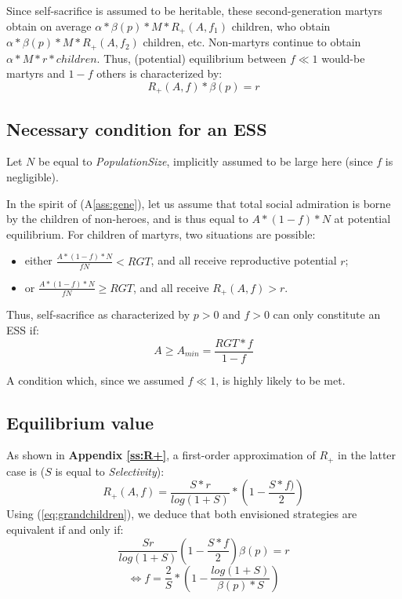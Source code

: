 \documentclass[a4paper,12pt]{report}
\begin{document}
Since self-sacrifice is assumed to be heritable, 
these second-generation martyrs obtain on average $\alpha*\beta(p)*M*R_+(A,f_1)$
children, who obtain $\alpha*\beta(p)*M*R_+(A,f_2)$ children, etc. Non-martyrs
continue to obtain $\alpha*M*r* children$.
Thus, (potential) equilibrium between $f\ll 1$ would-be martyrs and $1-f$ others is
characterized by:
\begin{equation}
    R_+(A,f)*\beta(p) = r
\label{eq:grandchildren}
\end{equation}


\subsection{Necessary condition for an ESS}
\label{ss: exo_existence}

Let $N$ be equal to \emph{PopulationSize}, implicitly assumed to be large here (since $f$
is negligible).

In the spirit of (A\ref{ass:gene}), let us assume
that total social admiration is borne by the children of non-heroes, and is thus equal to
$A*(1-f)*N$ at potential equilibrium. 
For children of martyrs, two situations are possible:

\begin{itemize}
\item either $\frac{A*(1-f)*N}{fN} < RGT$, and 
all receive reproductive potential $r$;
\item or $\frac{A*(1-f)*N}{fN} \geq RGT$, and all receive $R_{+}(A,f)>r$.
\end{itemize}

Thus, self-sacrifice as characterized by $p>0$ and $f>0$ can only constitute an ESS if:
\begin{equation}
    \label{eq:min_ESS_e}
    A \geq A_{min}=\frac{RGT*f}{1-f}
\end{equation}

A condition which, since we assumed $f \ll 1$, is highly likely to be met.

\subsection{Equilibrium value}

As shown in \textbf{Appendix \ref{ss:R+}}, a first-order approximation of $R_+$
in the latter case is ($S$ is equal to \emph{Selectivity}):
\begin{equation}
    R_+(A,f) = \frac{S*r}{log(1+S)} * (1 - \frac{S*f)}{2})
\label{eq:R+}
\end{equation}
Using (\ref{eq:grandchildren}), we deduce that both envisioned strategies are equivalent if
and only if:
\[\frac{Sr}{log(1+S)}(1-\frac{S*f}{2})\beta(p)=r  \]
\begin{equation}
    \label{eq:trinome_beta}
    \iff f = \frac{2}{S}*(1-\frac{log(1+S)}{\beta(p)*S})
\end{equation}
\end{document}
